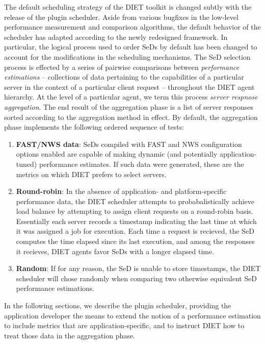 The default scheduling strategy of the DIET toolkit is changed subtly
with the release of the plugin scheduler.  Aside from various bugfixes
in the low-level
performance measurement and comparison algorithms, the default
behavior of the scheduler has adapted according to the newly
redesigned framework.  In particular, the logical process used to
order SeDs by default has been changed to account for the
modifications in
the scheduling mechanisms.  The SeD selection process is effected by a
series of pairwise comparisons between
\emph{performance estimations} -- collections of data pertaining to
the capabilities of a particular server in the context of a particular
client request -- throughout the DIET agent hierarchy.  At the level
of a particular agent, we term this process
\emph{server respnose aggregation}.  The end result of the aggregation
phase is a list of server responses sorted according to the
aggregation method in effect.
By default, the aggregation phase
implements the following ordered sequence of tests:

\begin{enumerate}
\item \textbf{FAST/NWS data}: SeDs compiled with FAST and NWS
  configuration options enabled are capable of making dynamic (and
  potentially application-tuned) performance estimates.  If such data
  were generated, these are the metrics on which DIET prefers to
  select servers.
\item \textbf{Round-robin}: In the absence of application- and
  platform-specific performance
  data, the DIET scheduler attempts to probabalistically achieve load
  balance by attempting to assign client requests on a round-robin
  basis.  Essentially each server records a timestamp indicating the
  last time at which it was assigned a job for execution.  Each time a
  request is recieved, the SeD computes the time elapsed since its
  last execution, and among the responses it recieves, DIET agents
  favor SeDs with a longer elapsed time.
\item \textbf{Random}: If for any reason, the SeD is unable to store
  timestamps, the DIET scheduler will chose randomly when
  comparing two otherwise equivalent SeD performance estimations.
\end{enumerate}

In the following sections, we describe the plugin scheduler, providing
the application developer the means to extend the notion of a
performance estimation to include metrics that are
application-specific, and to instruct DIET how to treat those data in
the aggregation phase.


